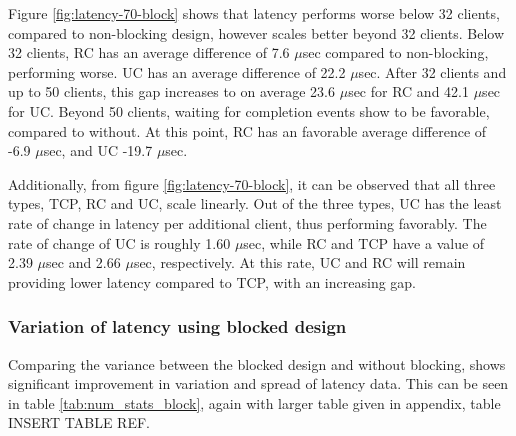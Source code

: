 Figure \ref{fig:latency-70-block} shows that latency performs worse below 32 clients, compared to non-blocking design, however scales better beyond 32 clients.
Below 32 clients, RC has an average difference of 7.6 $\mu$sec compared to non-blocking, performing worse.
UC has an average difference of 22.2 $\mu$sec.
After 32 clients and up to 50 clients, this gap increases to on average 23.6 $\mu$sec for RC and 42.1 $\mu$sec for UC.
Beyond 50 clients, waiting for completion events show to be favorable, compared to without.
At this point, RC has an favorable average difference of -6.9 $\mu$sec, and UC -19.7 $\mu$sec.

Additionally, from figure \ref{fig:latency-70-block}, it can be observed that all three types, TCP, RC and UC, scale linearly.
Out of the three types, UC has the least rate of change in latency per additional client, thus performing favorably.
The rate of change of UC is roughly 1.60 $\mu$sec, while RC and TCP have a value of 2.39 $\mu$sec and 2.66 $\mu$sec, respectively.
At this rate, UC and RC will remain providing lower latency compared to TCP, with an increasing gap.


\subsubsection{Variation of latency using blocked design}
Comparing the variance between the blocked design and without blocking, shows significant improvement in variation and spread of latency data.
This can be seen in table \ref{tab:num_stats_block}, again with larger table given in appendix, table INSERT TABLE REF.

